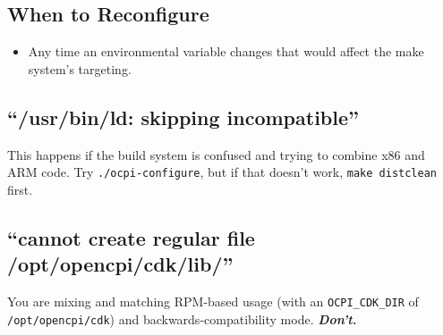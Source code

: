 \documentclass{article}
\begin{document}
\subsection{When to Reconfigure}
\begin{itemize}
\item Any time an environmental variable changes that would affect the make system's targeting.
\end{itemize}

\subsection{``/usr/bin/ld: skipping incompatible''}
This happens if the build system is confused and trying to combine x86 and ARM code. Try \verb+./ocpi-configure+, but if that doesn't work, \verb+make distclean+ first.

\subsection{``cannot create regular file /opt/opencpi/cdk/lib/''}
You are mixing and matching RPM-based usage (with an \verb+OCPI_CDK_DIR+ of \verb+/opt/opencpi/cdk+) and backwards-compatibility mode. \textbf{\textit{Don't.}}
\end{document}
